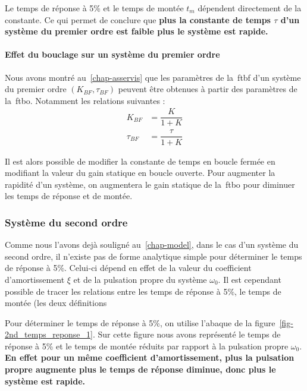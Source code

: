 Le temps de réponse à 5\% et le temps de montée $t_m$ dépendent 
directement de la constante. Ce qui permet de conclure que 
\textbf{plus la constante de temps $\tau$ d'un système du premier
ordre est faible plus le système est rapide.}

\paragraph{Effet du bouclage sur un système du premier ordre}
Nous avons montré au~\cref{chap-asservis} que les paramètres de 
la~\gls{ftbf} d'un système du premier ordre $(K_{BF},\tau_{BF})$ peuvent 
être obtenues à partir des paramètres de la~\gls{ftbo}. Notamment les relations
suivantes :
\begin{align*}
       K_{BF}&=\dfrac{K}{1+K}\\
    \tau_{BF}&=\dfrac{\tau}{1+K}
\end{align*}

Il est alors possible de modifier la constante de temps en boucle fermée en 
modifiant la valeur du gain statique en boucle ouverte. Pour augmenter
la rapidité d'un système, on augmentera le gain statique de la~\gls{ftbo} pour
diminuer les temps de réponse et de montée.

\subsubsection{Système du second ordre}
Comme nous l'avons dejà souligné au~\cref{chap-model}, dans le cas d'un système  
du second ordre, il n'existe pas de forme analytique simple pour déterminer 
le temps de réponse à 5\%. Celui-ci dépend en effet de la valeur du coefficient 
d'amortissement $\xi$ et de la pulsation propre du système $\omega_0$.
Il est cependant possible de tracer les relations entre les temps de réponse
à 5\%, le temps de montée (les deux définitions 

Pour déterminer le temps de réponse à 5\%, on utilise l'abaque de la 
figure~\cref{fig-2nd_temps_reponse_1}. Sur cette figure nous avons représenté
le temps de réponse à 5\% et le temps de montée réduits par rapport à la
pulsation propre $\omega_0$. \textbf{En effet pour un même coefficient 
d'amortissement, plus la pulsation propre augmente plus le temps de réponse 
diminue, donc plus le système est rapide.}

